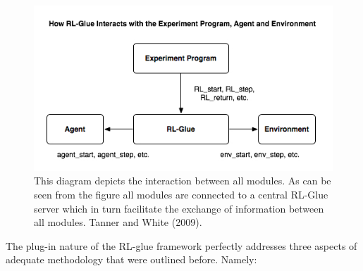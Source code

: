 \begin{figure}[ht]
\vskip 0.2in
\centering
\includegraphics[scale=0.9]{glue.png}
\caption{This diagram depicts the interaction between all modules. As can be seen from the figure all modules are connected to a central RL-Glue server which in turn facilitate the exchange of information between all modules. Tanner and White (2009).}
\vskip -0.2in
\label{fig:rlglue}
\end{figure}
The plug-in nature of the RL-glue framework perfectly addresses three aspects of adequate methodology that were outlined before. Namely:
